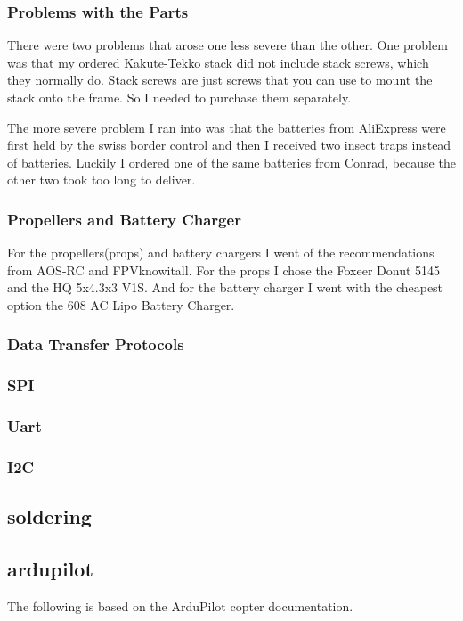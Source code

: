 \documentclass{article}
\begin{document}
	\subsubsection{Problems with the Parts}

	There were two problems that arose one less severe than the other. One problem was that my ordered Kakute-Tekko stack did not include stack screws, which they normally do. Stack screws are just screws that you can use to mount the stack onto the frame. So I needed to purchase them separately.
	
	The more severe problem I ran into was that the batteries from AliExpress were first held by the swiss border control and then I received two insect traps instead of batteries. Luckily I ordered one of the same batteries from Conrad, because the other two took too long to deliver. 
	
	\subsubsection{Propellers and Battery Charger}
	For the propellers(props) and battery chargers I went of the recommendations from AOS-RC and FPVknowitall. For the props I chose the Foxeer Donut 5145\cite{toroidal} and the HQ 5x4.3x3 V1S\cite{hqprops}. And for the battery charger I went with the cheapest option the 608 AC Lipo Battery Charger\cite{lipocharger}.

\subsubsection{Data Transfer Protocols}
	\subsubsection*{SPI}
	\subsubsection*{Uart}
	\subsubsection*{I2C}
	
	
	
	
	\subsection{soldering}
	
	\subsection{ardupilot}
	The following is based on the ArduPilot copter documentation\cite{ardupilotdocs}.
\end{document}
